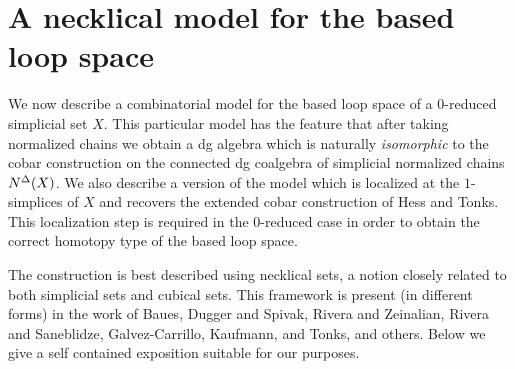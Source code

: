 \section{A necklical model for the based loop space}

We now describe a combinatorial model for the based loop space of a $0$-reduced simplicial set $X$. This particular model has the feature that after taking normalized chains we obtain a dg algebra which is naturally \textit{isomorphic} to the cobar construction on the connected dg coalgebra of simplicial normalized chains $N^{\Delta}(X)$. We also describe a version of the model which is localized at the $1$-simplices of $X$ and recovers the extended cobar construction of Hess and Tonks. This localization step is required in the $0$-reduced case in order to obtain the correct homotopy type of the based loop space. 

The construction is best described using necklical sets, a notion closely related to both simplicial sets and cubical sets. This framework is present (in different forms) in the work of Baues, Dugger and Spivak, Rivera and Zeinalian, Rivera and Saneblidze, Galvez-Carrillo, Kaufmann, and Tonks, and others. Below we give a self contained exposition suitable for our purposes. 




